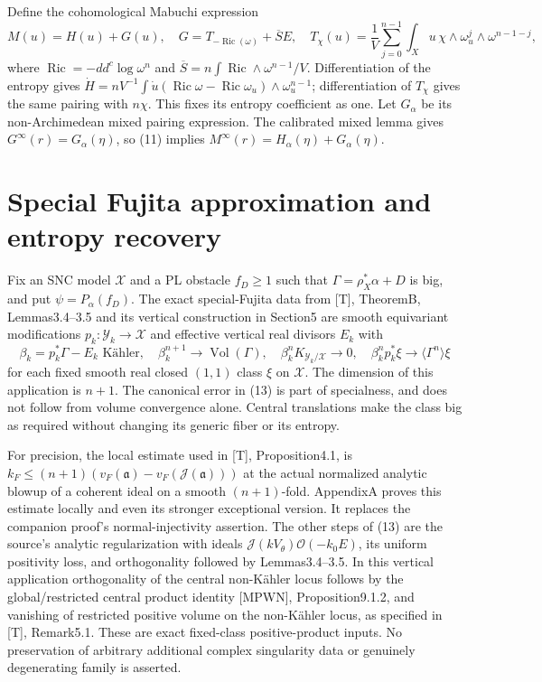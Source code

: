 \documentclass[11pt]{article}
\newcommand{\Ric}{\operatorname{Ric}}
\newcommand{\Vol}{\operatorname{Vol}}
\newcommand{\J}{\mathcal J}
\begin{document}
Define the cohomological Mabuchi expression
\[
 M(u)=H(u)+G(u),\quad
 G=T_{-\Ric(\omega)}+\overline S E,\quad
 T_\chi(u)=\frac1V\sum_{j=0}^{n-1}
  \int_Xu\,\chi\wedge\omega_u^j\wedge\omega^{n-1-j},       \tag{12}
\]
where $\Ric=-dd^c\log\omega^n$ and
$\overline S=n\int\Ric\wedge\omega^{n-1}/V$.
Differentiation of the entropy gives
$\dot H=nV^{-1}\int\dot u(\Ric\omega-\Ric\omega_u)
\wedge\omega_u^{n-1}$; differentiation of $T_\chi$ gives the
same pairing with $n\chi$. This fixes its entropy coefficient as one.
Let $G_\alpha$ be its non-Archimedean mixed pairing expression.
The calibrated mixed lemma gives
$G^\infty(r)=G_\alpha(\eta)$, so (11) implies
$M^\infty(r)=H_\alpha(\eta)+G_\alpha(\eta)$.

\section{Special Fujita approximation and entropy recovery}
Fix an SNC model $\mathcal X$ and a PL obstacle $f_D\geq1$ such that
$\Gamma=\rho_X^*\alpha+D$ is big, and put $\psi=P_\alpha(f_D)$.
The exact special-Fujita data from [T], TheoremB, Lemmas3.4--3.5
and its vertical construction in Section5 are smooth equivariant
modifications $p_k:\mathcal Y_k\to\mathcal X$ and effective vertical
real divisors $E_k$ with
\[
 \beta_k=p_k^*\Gamma-E_k\text{ K\"ahler},\quad
 \beta_k^{n+1}\to\Vol(\Gamma),\quad
 \beta_k^nK_{\mathcal Y_k/\mathcal X}\to0,\quad
 \beta_k^np_k^*\xi\to\langle\Gamma^n\rangle\xi            \tag{13}
\]
for each fixed smooth real closed $(1,1)$ class $\xi$ on $\mathcal X$.
The dimension of this application is $n+1$. The canonical error in
(13) is part of specialness, and does not follow from volume
convergence alone. Central translations make the class big as required
without changing its generic fiber or its entropy.

For precision, the local estimate used in [T], Proposition4.1, is
$k_F\leq (n+1)(v_F(\mathfrak a)-v_F(\J(\mathfrak a)))$ at
the actual normalized analytic blowup of a coherent ideal on a
smooth $(n+1)$-fold. AppendixA proves this estimate locally and even
its stronger exceptional version. It replaces the companion proof's
normal-injectivity assertion. The other steps of (13) are the source's
analytic regularization with ideals
$\J(kV_\theta)\mathcal O(-k_0E)$, its uniform positivity loss,
and orthogonality followed by Lemmas3.4--3.5.
In this vertical application orthogonality of the central non-K\"ahler
locus follows by the global/restricted central product identity
[MPWN], Proposition9.1.2, and vanishing of restricted positive volume on
the non-K\"ahler locus, as specified in [T], Remark5.1.
These are exact fixed-class positive-product inputs. No preservation
of arbitrary additional complex singularity data or genuinely
degenerating family is asserted.
\end{document}
